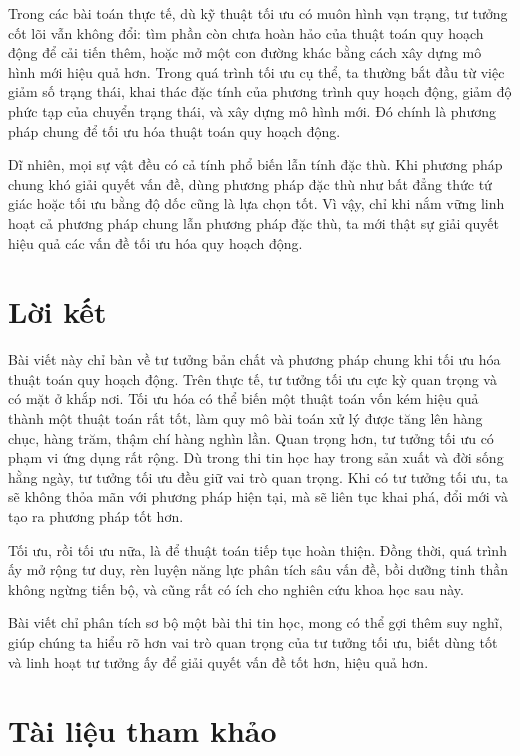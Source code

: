 \documentclass[11pt]{article}
\begin{document}
Trong các bài toán thực tế, dù kỹ thuật tối ưu có muôn hình vạn trạng, tư
tưởng cốt lõi vẫn không đổi: tìm phần còn chưa hoàn hảo của thuật toán quy
hoạch động để cải tiến thêm, hoặc mở một con đường khác bằng cách xây dựng mô
hình mới hiệu quả hơn. Trong quá trình tối ưu cụ thể, ta thường bắt đầu từ
việc giảm số trạng thái, khai thác đặc tính của phương trình quy hoạch động,
giảm độ phức tạp của chuyển trạng thái, và xây dựng mô hình mới. Đó chính là
phương pháp chung để tối ưu hóa thuật toán quy hoạch động.

Dĩ nhiên, mọi sự vật đều có cả tính phổ biến lẫn tính đặc thù. Khi phương pháp
chung khó giải quyết vấn đề, dùng phương pháp đặc thù như bất đẳng thức tứ
giác hoặc tối ưu bằng độ dốc cũng là lựa chọn tốt. Vì vậy, chỉ khi nắm vững
linh hoạt cả phương pháp chung lẫn phương pháp đặc thù, ta mới thật sự giải
quyết hiệu quả các vấn đề tối ưu hóa quy hoạch động.

\section{Lời kết}

Bài viết này chỉ bàn về tư tưởng bản chất và phương pháp chung khi tối ưu hóa
thuật toán quy hoạch động. Trên thực tế, tư tưởng tối ưu cực kỳ quan trọng và
có mặt ở khắp nơi. Tối ưu hóa có thể biến một thuật toán vốn kém hiệu quả
thành một thuật toán rất tốt, làm quy mô bài toán xử lý được tăng lên hàng
chục, hàng trăm, thậm chí hàng nghìn lần. Quan trọng hơn, tư tưởng tối ưu có
phạm vi ứng dụng rất rộng. Dù trong thi tin học hay trong sản xuất và đời sống
hằng ngày, tư tưởng tối ưu đều giữ vai trò quan trọng. Khi có tư tưởng tối ưu,
ta sẽ không thỏa mãn với phương pháp hiện tại, mà sẽ liên tục khai phá, đổi
mới và tạo ra phương pháp tốt hơn.

Tối ưu, rồi tối ưu nữa, là để thuật toán tiếp tục hoàn thiện. Đồng thời, quá
trình ấy mở rộng tư duy, rèn luyện năng lực phân tích sâu vấn đề, bồi dưỡng
tinh thần không ngừng tiến bộ, và cũng rất có ích cho nghiên cứu khoa học sau
này.

Bài viết chỉ phân tích sơ bộ một bài thi tin học, mong có thể gợi thêm suy
nghĩ, giúp chúng ta hiểu rõ hơn vai trò quan trọng của tư tưởng tối ưu, biết
dùng tốt và linh hoạt tư tưởng ấy để giải quyết vấn đề tốt hơn, hiệu quả hơn.

\section*{Tài liệu tham khảo}
\end{document}
